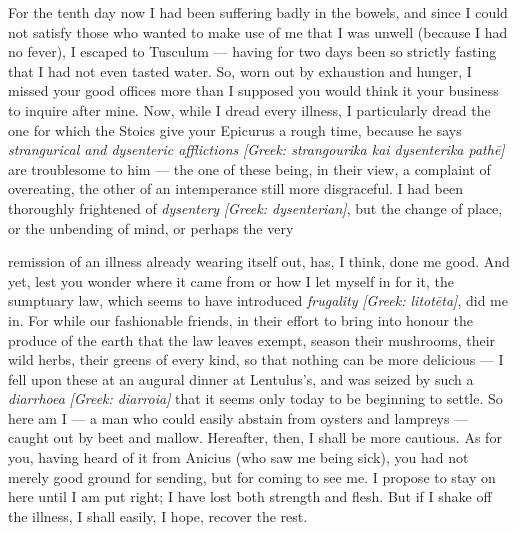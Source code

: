 

 For the tenth day now I had been suffering badly in the bowels, and since I could not satisfy those who wanted to make use of me that I was unwell (because I had no fever), I escaped to Tusculum --- having for two days been so strictly fasting that I had not even tasted water. So, worn out by exhaustion and hunger, I missed your good offices more than I supposed you would think it your business to inquire after mine. Now, while I dread every illness, I particularly dread the one for which the Stoics give your Epicurus a rough time, because he says \textit{strangurical and dysenteric afflictions} \textit{[Greek: strangourika kai dysenterika pathē]} are troublesome to him --- the one of these being, in their view, a complaint of overeating, the other of an intemperance still more disgraceful. I had been thoroughly frightened of \textit{dysentery} \textit{[Greek: dysenterian]}, but the change of place, or the unbending of mind, or perhaps the very

 remission of an illness already wearing itself out, has, I think, done me good. And yet, lest you wonder where it came from or how I let myself in for it, the sumptuary law, which seems to have introduced \textit{frugality} \textit{[Greek: litotēta]}, did me in. For while our fashionable friends, in their effort to bring into honour the produce of the earth that the law leaves exempt, season their mushrooms, their wild herbs, their greens of every kind, so that nothing can be more delicious --- I fell upon these at an augural dinner at Lentulus's, and was seized by such a \textit{diarrhoea} \textit{[Greek: diarroia]} that it seems only today to be beginning to settle. So here am I --- a man who could easily abstain from oysters and lampreys --- caught out by beet and mallow. Hereafter, then, I shall be more cautious. As for you, having heard of it from Anicius (who saw me being sick), you had not merely good ground for sending, but for coming to see me. I propose to stay on here until I am put right; I have lost both strength and flesh. But if I shake off the illness, I shall easily, I hope, recover the rest.

